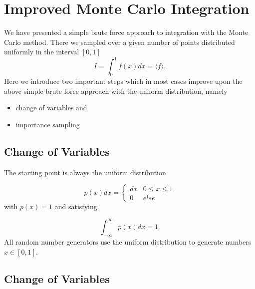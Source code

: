 \documentclass[%
oneside,                 %
final,                   %
10pt]{article}
\newenvironment{block_mdfboxadmon}[1][]{
\begin{block_mdfboxmdframed}[frametitle=#1]
}
{
\end{block_mdfboxmdframed}
}
\begin{document}
\section{Improved Monte Carlo Integration}

\begin{block_mdfboxadmon}[]
We have presented a simple brute force approach 
to integration with the Monte Carlo method. There we sampled
over a given number of points distributed uniformly in the interval
$[0,1]$
\begin{equation*}
   I=\int_0^1 f(x)dx=\langle f\rangle.
\end{equation*}
Here we introduce two important steps which in most cases improve
upon the above simple brute force approach with the uniform distribution, namely
\begin{itemize}
\item change of variables and

\item importance sampling
\end{itemize}

\noindent
\end{block_mdfboxadmon} %



\subsection{Change of Variables}

\begin{block_mdfboxadmon}[]
The starting point is always the uniform distribution

\begin{equation*}
p(x)dx=\left\{\begin{array}{cc} dx & 0 \le x \le 1\\
                                0  & else\end{array}\right.
\end{equation*}
with $p(x)=1$ and 
satisfying

\begin{equation*}
  \int_{-\infty}^{\infty}p(x)dx=1.
\end{equation*}
All random number generators  use the uniform distribution to generate numbers $x\in [0,1]$.
\end{block_mdfboxadmon} %



\subsection{Change of Variables}
\end{document}

